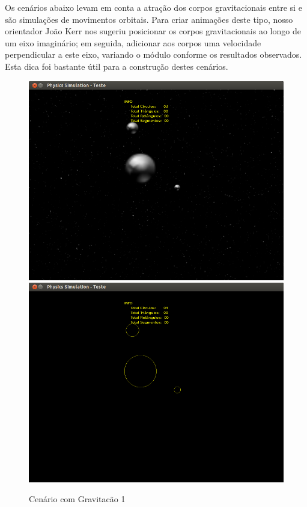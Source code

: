 Os cenários abaixo levam em conta a atração dos corpos gravitacionais entre si e são simulações de movimentos orbitais. Para criar animações deste tipo, nosso orientador João Kerr nos sugeriu posicionar os corpos gravitacionais ao longo de um eixo imaginário; em seguida, adicionar aos corpos uma velocidade perpendicular a este eixo, variando o módulo conforme os resultados observados. Esta dica foi bastante útil para a construção destes cenários.

\begin{figure}[H]
	\centering
	\includegraphics[scale=0.2]{images/cenario-gravitacao-2.png}
	\includegraphics[scale=0.2]{images/cenario-gravitacao.png}
	\caption{Cenário com Gravitacão 1}
\end{figure}

